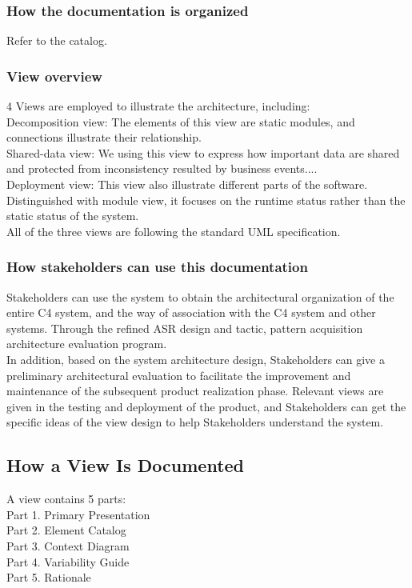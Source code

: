 \documentclass{article}
\begin{document}
	\subsubsection{How the documentation is organized}
	Refer to the catalog.
	\subsubsection{View overview}
	4 Views are employed to illustrate the architecture, including:\\  
	Decomposition view: The elements of this view are static modules, and connections illustrate their relationship.\\  
	Shared-data view: We using this view to express how important data are shared and protected from inconsistency resulted by business events....  \\
	Deployment view: This view also illustrate different parts of the software. Distinguished with module view, it focuses on the runtime status rather than the static status of the system.\\
	All of the three views are following the standard UML specification.
	\subsubsection{How stakeholders can use this documentation}
	Stakeholders can use the system to obtain the architectural organization of the entire C4 system, and the way of association with the C4 system and other systems.
	Through the refined ASR design and tactic, pattern acquisition architecture evaluation program.\\
	In addition, based on the system architecture design, Stakeholders can give a preliminary architectural evaluation to facilitate the improvement and maintenance of the subsequent product realization phase.
	Relevant views are given in the testing and deployment of the product, and Stakeholders can get the specific ideas of the view design to help Stakeholders understand the system.\\
	\subsection{How a View Is Documented}
	A view contains 5 parts:\\
	Part 1. Primary Presentation\\
	Part 2. Element Catalog\\
	Part 3. Context Diagram\\
	Part 4. Variability Guide\\
	Part 5. Rationale\\
\end{document}
